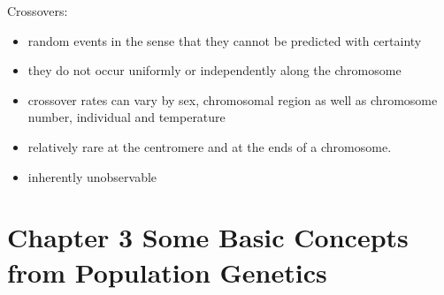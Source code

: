 \documentclass[a4paper,twoside,11pt]{article}
\begin{document}
\textcolor{NavyBlue}{Crossovers:} 
\begin{itemize}
    \item random events in the sense that they cannot be predicted with certainty
    \item they do not occur uniformly or independently along the chromosome
    \item crossover rates can vary by sex, chromosomal region as well as chromosome number, individual and temperature
    \item relatively rare at the centromere and at the ends of a chromosome. 
    \item inherently unobservable
\end{itemize}
\section{Chapter 3 Some Basic Concepts from Population Genetics}
\end{document}
